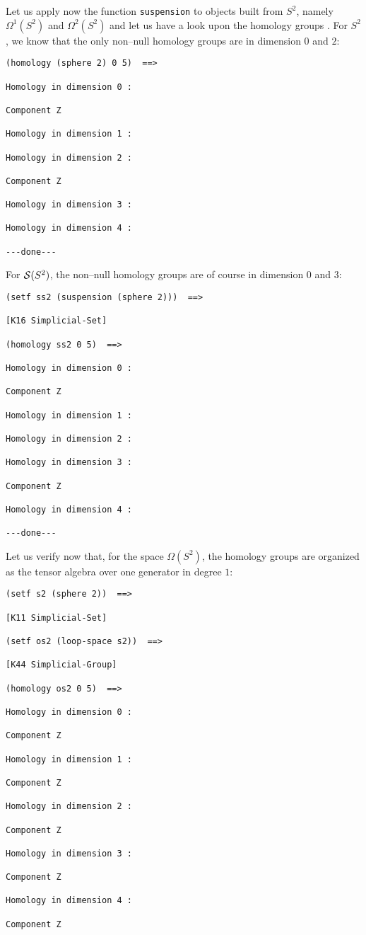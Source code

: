Let us   apply  now the function {\tt suspension}  to 
objects built from $S^2$, namely $\Omega^1(S^2)$ and $\Omega^2(S^2)$ and let us have a look
upon the homology groups . For $S^2$, we know that the only
non--null homology groups are in dimension $0$ and $2$:
{\footnotesize\begin{verbatim}
(homology (sphere 2) 0 5)  ==>

Homology in dimension 0 :

Component Z

Homology in dimension 1 :

Homology in dimension 2 :

Component Z

Homology in dimension 3 :

Homology in dimension 4 :

---done---
\end{verbatim}}
For ${\cal S}(S^2)$, the non--null homology groups are of course in dimension $0$ and $3$:
{\footnotesize\begin{verbatim}
(setf ss2 (suspension (sphere 2)))  ==>

[K16 Simplicial-Set]

(homology ss2 0 5)  ==>

Homology in dimension 0 :

Component Z

Homology in dimension 1 :

Homology in dimension 2 :

Homology in dimension 3 :

Component Z

Homology in dimension 4 :

---done---
\end{verbatim}}
Let us verify now that, for the space $\Omega(S^2)$, the homology groups are organized as 
the tensor algebra over one generator in degree $1$:
{\footnotesize\begin{verbatim}
(setf s2 (sphere 2))  ==>

[K11 Simplicial-Set]

(setf os2 (loop-space s2))  ==>

[K44 Simplicial-Group]

(homology os2 0 5)  ==>

Homology in dimension 0 :

Component Z

Homology in dimension 1 :

Component Z

Homology in dimension 2 :

Component Z

Homology in dimension 3 :

Component Z

Homology in dimension 4 :

Component Z

\end{verbatim}}

